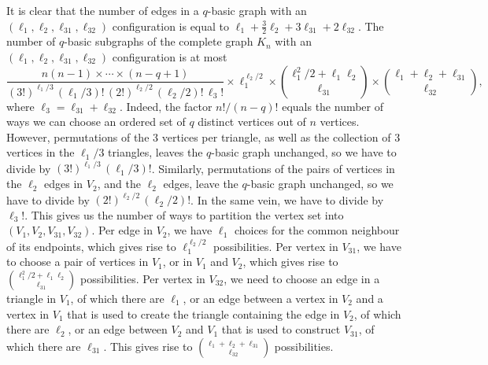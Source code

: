 \documentclass[bj,authoryear,noshowframe]{imsart}
\numberwithin{equation}{section}
\theoremstyle{plain}
\theoremstyle{definition}
\begin{document}
It is clear that the number of edges in a $q$-basic graph with an $(\ell_1,\ell_2,\ell_{31},\ell_{32})$ configuration is equal to $\ell_1 + \tfrac32 \ell_2 + 3 \ell_{31} + 2\ell_{32}$. The number of $q$-basic subgraphs of the complete graph $K_n$ with an $(\ell_1,\ell_2,\ell_{31},\ell_{32})$ configuration is at most 
	\begin{equation}
	\label{e:form1}
	\frac{n(n-1) \times\cdots\times (n-q +1)} {(3!)^{\ell_1/3} \, (\ell_1/3)! \, (2!)^{{\ell_2/2}} \, (\ell_2/2)! \, \ell_3!}
	\times \ell_1^{\ell_2/2} \times {\ell_1^2/2 
	+ \ell_1 \ell_2 \choose \ell_{31}} \times {\ell_1 + \ell_2 + \ell_{31} \choose \ell_{32}},
	\end{equation}
where $\ell_3 = \ell_{31} + \ell_{32}$. Indeed, the factor $n!/(n-q)!$ equals the number of ways we can choose {an ordered set of $q$ distinct vertices out of $n$ vertices}. However, permutations of the 3 vertices per triangle, as well as the collection of 3 vertices in the $\ell_1/3$ triangles, leaves the $q$-basic graph unchanged, so we have to divide by $(3!)^{\ell_1/3}\,(\ell_1/3)!$. Similarly, permutations of the pairs of vertices in the $\ell_2$ edges in $V_2$, and the $\ell_2$ edges, leave the $q$-basic graph unchanged, so we have to divide by $(2!)^{\ell_2/2}\,(\ell_2/2)!$. In the same vein, we have to divide by $\ell_3!$. This gives us the number of ways to partition the vertex set into $(V_1,V_2,V_{31}, V_{32})$. Per edge in $V_2$, we have $\ell_1$ choices for the common neighbour of its endpoints, which gives rise to $\ell_1^{\ell_2/2}$ possibilities. Per vertex in $V_{31}$, we have to choose a pair of vertices in $V_1$, or in $V_1$ and $V_2$, which gives rise to ${\ell_1^2/2 + \ell_1 \ell_2 \choose \ell_{31}}$ possibilities. Per vertex in $V_{32}$, we need to choose an edge in a triangle in $V_1$, of which there are $\ell_1$, or an edge between a vertex in $V_2$ and a vertex in $V_1$ that is used to create the triangle containing the edge in $V_2$, of which there are $\ell_2$, or an edge between $V_2$ and $V_1$ that is used to construct $V_{31}$, of which there are $\ell_{31}$. This gives rise to ${\ell_1+ \ell_2+\ell_{31} \choose \ell_{32}}$ possibilities.
\end{document}
